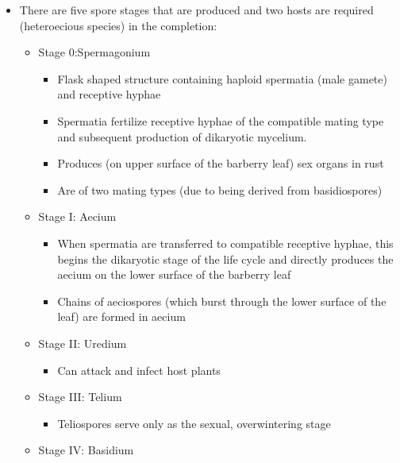 \documentclass[10pt,dvipsnames,ignorenonframetext,aspectratio=169]{beamer}
\providecommand{\tightlist}{%
  \setlength{\itemsep}{0pt}\setlength{\parskip}{0pt}}
\begin{document}
\begin{frame}{}
\protect\hypertarget{section-1}{}
\begin{itemize}
\tightlist
\item
  There are five spore stages that are produced and two hosts are
  required (heteroecious species) in the completion:

  \begin{itemize}
  \tightlist
  \item
    Stage 0:Spermagonium

    \begin{itemize}
    \tightlist
    \item
      Flask shaped structure containing haploid spermatia (male gamete)
      and receptive hyphae
    \item
      Spermatia fertilize receptive hyphae of the compatible mating type
      and subsequent production of dikaryotic mycelium.
    \item
      Produces (on upper surface of the barberry leaf) sex organs in
      rust
    \item
      Are of two mating types (due to being derived from basidiospores)
    \end{itemize}
  \item
    Stage I: Aecium

    \begin{itemize}
    \tightlist
    \item
      When spermatia are transferred to compatible receptive hyphae,
      this begins the dikaryotic stage of the life cycle and directly
      produces the aecium on the lower surface of the barberry leaf
    \item
      Chains of aeciospores (which burst through the lower surface of
      the leaf) are formed in aecium
    \end{itemize}
  \item
    Stage II: Uredium

    \begin{itemize}
    \tightlist
    \item
      Can attack and infect host plants
    \end{itemize}
  \item
    Stage III: Telium

    \begin{itemize}
    \tightlist
    \item
      Teliospores serve only as the sexual, overwintering stage
    \end{itemize}
  \item
    Stage IV: Basidium


\end{itemize}
\end{itemize}
\end{frame}
\end{document}
